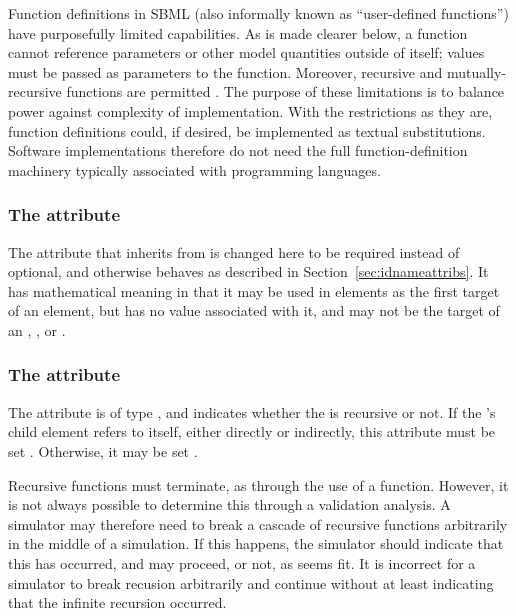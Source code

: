 Function definitions in SBML (also informally known as
``user-defined functions'') have purposefully limited capabilities.
As is made clearer below, a function cannot reference
parameters or other model quantities outside of itself; values
must be passed as parameters to the function.  Moreover, recursive
and mutually-recursive functions are permitted .  The purpose
of these limitations is to balance power against complexity of
implementation.  With the restrictions as they are, function
definitions could, if desired, be implemented as textual substitutions.
Software implementations therefore do not need
the full function-definition machinery typically associated with
programming languages.

\begin{blockChanged}
\subsubsection{The  attribute}

The  attribute that \FunctionDefinition inherits from \SBase is changed here to be required instead of optional, and otherwise behaves as described in Section~\ref{sec:idnameattribs}.  It has mathematical meaning in that it may be used in  elements as the first target of an  element, but has no value associated with it, and may not be the target of an \InitialAssignment, \EventAssignment, or \Rule.


\subsubsection{The  attribute}

The  attribute is of type , and indicates whether the \FunctionDefinition is recursive or not.  If the \FunctionDefinition's child  element refers to itself, either directly or indirectly, this attribute must be set .  Otherwise, it may be set .

Recursive functions must terminate, as through the use of a  function.  However, it is not always possible to determine this through a validation analysis.  A simulator may therefore need to break a cascade of recursive functions arbitrarily in the middle of a simulation.  If this happens, the simulator should indicate that this has occurred, and may proceed, or not, as seems fit.  It is incorrect for a simulator to break recusion arbitrarily and continue without at least indicating that the infinite recursion occurred.
\end{blockChanged}


